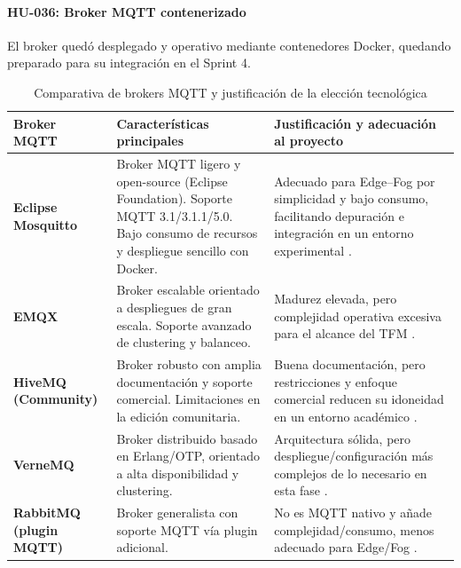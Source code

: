 \documentclass{report}
\begin{document}
\paragraph{HU-036: Broker MQTT contenerizado}
El broker quedó desplegado y operativo mediante contenedores Docker, quedando preparado para su integración en el Sprint 4.
\begin{table}[H]
\centering
\footnotesize
\caption{Comparativa de brokers MQTT y justificación de la elección tecnológica}
\label{tab:comparativa-mqtt}

\renewcommand{\arraystretch}{1.25}
\setlength{\tabcolsep}{3pt}

\begin{tabularx}{\linewidth}{@{} p{3.2cm} p{4.3cm} >{\RaggedRight\arraybackslash}X @{}}
\toprule
\textbf{Broker MQTT} 
& \textbf{Características principales} 
& \textbf{Justificación y adecuación al proyecto} \\
\midrule

\textbf{Eclipse Mosquitto} 
& Broker MQTT ligero y open-source (Eclipse Foundation). Soporte MQTT 3.1/3.1.1/5.0. Bajo consumo de recursos y despliegue sencillo con Docker. 
& Adecuado para Edge--Fog por simplicidad y bajo consumo, facilitando depuración e integración en un entorno experimental \cite{mosquitto_docs, mosquitto_project, mqtt_comparison_hivemq}. \\

\textbf{EMQX} 
& Broker escalable orientado a despliegues de gran escala. Soporte avanzado de clustering y balanceo. 
& Madurez elevada, pero complejidad operativa excesiva para el alcance del TFM \cite{emqx_docs, mqtt_comparison_emqx}. \\

\textbf{HiveMQ (Community)} 
& Broker robusto con amplia documentación y soporte comercial. Limitaciones en la edición comunitaria. 
& Buena documentación, pero restricciones y enfoque comercial reducen su idoneidad en un entorno académico \cite{hivemq_docs}. \\

\textbf{VerneMQ} 
& Broker distribuido basado en Erlang/OTP, orientado a alta disponibilidad y clustering. 
& Arquitectura sólida, pero despliegue/configuración más complejos de lo necesario en esta fase \cite{vernemq_docs}. \\

\textbf{RabbitMQ (plugin MQTT)} 
& Broker generalista con soporte MQTT vía plugin adicional. 
& No es MQTT nativo y añade complejidad/consumo, menos adecuado para Edge/Fog \cite{rabbitmq_mqtt}. \\
\bottomrule
\end{tabularx}
\end{table}
\end{document}
